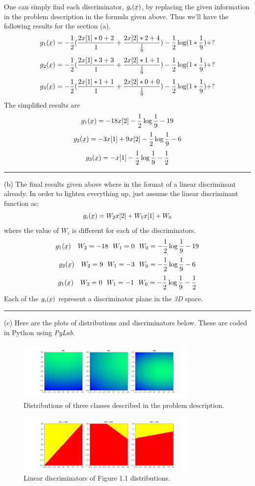 \documentclass[12pt]{article}
\numberwithin{equation}{section}
\numberwithin{table}{section}
\numberwithin{figure}{section}
\begin{document}
One can simply find each discriminator, $g_{i}(\underaccent{\bar}{x})$, by replacing the given information in the problem description in the formula given above. Thus we'll have the following results for the section (a).
$$
	g_{1}(\underaccent{\bar}{x}) = -\frac{1}{2}(\frac{2x[1]*0 + 2}{1} + \frac{2x[2]*2 + 4}{\frac{1}{9}}) - \frac{1}{2}\log(1*\frac{1}{9}) + ?
$$
$$
g_{2}(\underaccent{\bar}{x}) = -\frac{1}{2}(\frac{2x[1]*3 + 3}{1} + \frac{2x[2]*1 + 1}{\frac{1}{9}}) - \frac{1}{2}\log(1*\frac{1}{9}) + ?
$$
$$
g_{3}(\underaccent{\bar}{x}) = -\frac{1}{2}(\frac{2x[1]*1 + 1}{1} + \frac{2x[2]*0 + 0}{\frac{1}{9}}) - \frac{1}{2}\log(1*\frac{1}{9}) + ?
$$
The simplified results are
$$
	g_{1}(\underaccent{\bar}{x}) = -18x[2] - \frac{1}{2}\log\frac{1}{9} - 19
$$
$$
	g_{2}(\underaccent{\bar}{x}) = -3x[1] + 9x[2] - \frac{1}{2}\log\frac{1}{9} - 6
$$
$$
	g_{3}(\underaccent{\bar}{x}) = -x[1] - \frac{1}{2}\log\frac{1}{9} - \frac{1}{2}
$$
\noindent\rule{\textwidth}{.5pt}
(b) The final results given above where in the format of a linear discriminant already. In order to lighten everything up, just assume the linear discriminant function as:
$$
	g_{i}(\underaccent{\bar}{x}) = W_{2}x[2] + W_{1}x[1] + W_0
$$
where the value of $W_i$ is different for each of the discriminators.
$$
	g_{1}(\underaccent{\bar}{x}) \ \ \ W_2 = -18 \ \ W_1 = 0 \ \ W_0 =  - \frac{1}{2}\log\frac{1}{9} - 19
$$
$$
g_{2}(\underaccent{\bar}{x}) \ \ \ W_2 = 9 \ \ W_1 = -3 \ \ W_0 =  - \frac{1}{2}\log\frac{1}{9} - 6
$$
$$
g_{1}(\underaccent{\bar}{x}) \ \ \ W_2 = 0 \ \ W_1 = -1 \ \ W_0 =  - \frac{1}{2}\log\frac{1}{9} - \frac{1}{2}
$$
Each of the $g_{i}(\underaccent{\bar}{x})$ represent a discriminator plane in the \textit{3D} space.

\noindent\rule{\textwidth}{.5pt}
(c) Here are the plots of distributions and discriminators below. These are coded in Python using \textit{PyLab}.
\begin{figure}[!h]\centering
	\includegraphics[width=0.8\textwidth]{1_c_1.png}
	\caption{Distributions of three classes described in the problem description.}
	\label{pl1}
\end{figure}
\begin{figure}[!h]\centering
	\includegraphics[width=0.8\textwidth]{1_c_2.png}
	\caption{Linear discriminators of Figure 1.1 distributions.}
	\label{pl2}
\end{figure}
\end{document}
